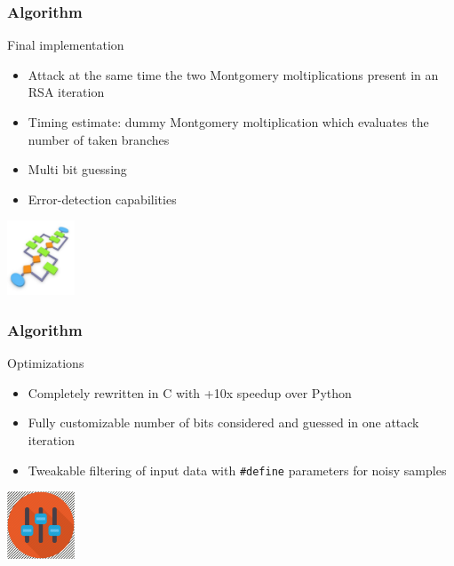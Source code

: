 \documentclass{beamer}
\begin{document}
\begin{frame}[fragile]
    \frametitle{Algorithm}
    \begin{block}{Final implementation}
        \begin{itemize}
            \pause \item Attack at the same time the two Montgomery moltiplications present in an RSA iteration
            \pause \item Timing estimate: dummy Montgomery moltiplication which evaluates the number of taken branches
            \pause \item Multi bit guessing
            \pause \item Error-detection capabilities
        \end{itemize}
    \end{block}
    \hfill \includegraphics[width=2cm]{./graphics/algorithm}
\end{frame}

\begin{frame}[fragile]
    \frametitle{Algorithm}
    \begin{block}{Optimizations}
        \begin{itemize}
            \pause \item Completely rewritten in C with +10x speedup over Python
            \pause \item Fully customizable number of bits considered and guessed in one attack iteration
            \pause \item Tweakable filtering of input data with \texttt{\#define} parameters for noisy samples
        \end{itemize}
    \end{block}
    \hfill \includegraphics[width=2cm]{./graphics/tweak}
\end{frame}
\end{document}
